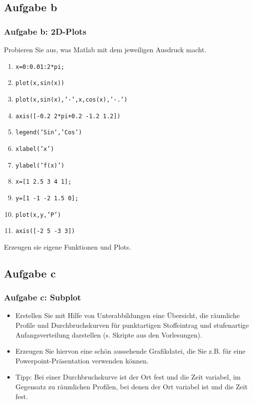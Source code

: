 \subsection{Aufgabe b}
  	\begin{frame}
		\frametitle{Aufgabe b: 2D-Plots}
          \begin{exercise}
              \sloppy          
           Probieren Sie aus, was Matlab mit dem jeweiligen Ausdruck macht.
           
		  \begin{footnotesize}
		     \begin{enumerate}
      	 	 	\item \texttt{x=0:0.01:2*pi;}
				\item \texttt{plot(x,sin(x))}
				\item \texttt{plot(x,sin(x),’-’,x,cos(x),’-.’)}
				\item \texttt{axis([-0.2 2*pi+0.2 -1.2 1.2])}
				\item \texttt{legend(’Sin’,’Cos’)}
				\item \texttt{xlabel(’x’)}
				\item \texttt{ylabel(’f(x)’)}
				\item \texttt{x=[1 2.5 3 4 1];}
				\item \texttt{y=[1 -1 -2 1.5 0];}
				\item \texttt{plot(x,y,’P’)}
				\item \texttt{axis([-2 5 -3 3])}
      	 	 \end{enumerate}
		\end{footnotesize}         	 
      	 Erzeugen sie eigene Funktionen und Plots.
                
		  \end{exercise}
   		\end{frame}
 
\subsection{Aufgabe c}
  	\begin{frame}
		\frametitle{Aufgabe c: Subplot}
          \begin{exercise}
              \sloppy          
           \begin{itemize}
           	\item Erstellen Sie mit Hilfe von Unterabbildungen eine Übersicht, die räumliche Profile und Durchbruchskurven für punktartigen Stoffeintrag und stufenartige Anfangsverteilung darstellen (s. Skripte aus den Vorlesungen).
           	\item Erzeugen Sie hiervon eine schön aussehende Grafikdatei, die Sie z.B. für eine Powerpoint-Präsentation verwenden können.
           	\item Tipp: Bei einer Durchbruchskurve ist der Ort fest und die Zeit variabel, im Gegensatz zu räumlichen Profilen, bei denen der Ort variabel ist und die Zeit fest.
           \end{itemize}
                
		  \end{exercise}
   		\end{frame}




